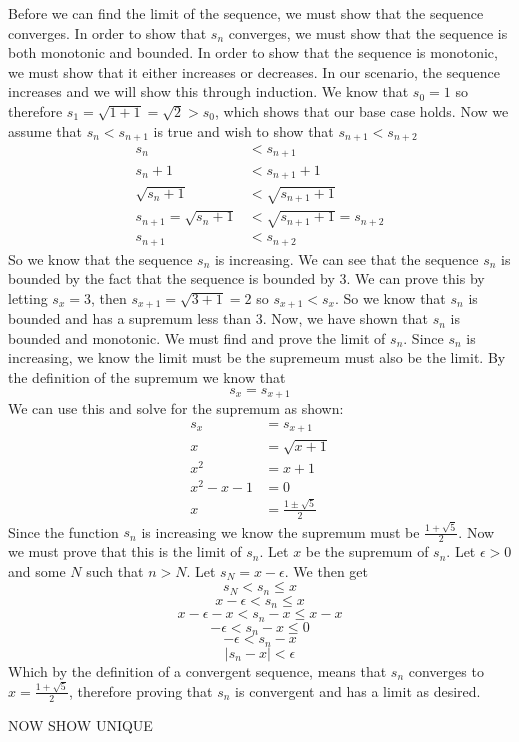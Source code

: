 \begin{solution}
Before we can find the limit of the sequence, we must show that the sequence converges. In order to show that $s_n$ converges, we must show that the sequence is both monotonic and bounded. In order to show that the sequence is monotonic, we must show that it either increases or decreases. In our scenario, the sequence increases and we will show this through induction. We know that $s_0 = 1$ so therefore $s_1 = \sqrt{1 + 1} = \sqrt{2} > s_0$, which shows that our base case holds. Now we assume that $s_n < s_{n+1}$ is true and wish to show that $s_{n+1} < s_{n+2}$
\begin{align*}
    s_n & < s_{n+1} \\
    s_n  + 1& < s_{n+1} + 1\\
    \sqrt{s_n  + 1}& < \sqrt{s_{n+1} + 1}\\
    s_{n+1}= \sqrt{s_n  + 1}& < \sqrt{s_{n+1} + 1} = s_{n+2}\\
    s_{n+1}& < s_{n+2}
\end{align*}
So we know that the sequence $s_n$ is increasing. We can see that the sequence $s_n$ is bounded by the fact that the sequence is bounded by 3. We can prove this by letting $s_x = 3$, then $s_{x+1} = \sqrt{3 + 1} = 2$ so $s_{x+1} < s_x$.
So we know that $s_n$ is bounded and has a supremum less than 3.
Now, we have shown that $s_n$ is bounded and monotonic. We must find and prove the limit of $s_n$. Since $s_n$ is increasing, we know the limit must be the supremeum must also be the limit.
By the definition of the supremum we know that $$s_x = s_{x+1}$$
We can use this and solve for the supremum as shown:
\begin{align*}
    s_x &= s_{x+1} \\
    x &= \sqrt{x + 1} \\
    x^2 &= x + 1 \\
    x^2 - x -1 & = 0\\
    x & = \frac{1 \pm \sqrt{5}}{2}
\end{align*}
Since the function $s_n$ is increasing we know the supremum must be $\frac{1 + \sqrt{5}}{2}$. Now we must prove that this is the limit of $s_n$. Let $x$ be the supremum of $s_n$. Let $\epsilon > 0$ and some $N$ such that $n>N$. Let $s_N = x - \epsilon$. We then get
$$s_N < s_n \leq x $$
$$ x - \epsilon < s_n \leq x $$
$$ x - \epsilon -x  < s_n - x \leq x - x $$
$$ - \epsilon  < s_n - x \leq 0$$
$$ - \epsilon  < s_n - x$$
$$|s_n - x| < \epsilon$$
Which by the definition of a convergent sequence, means that $s_n$ converges to $x = \frac{1 + \sqrt{5}}{2}$, therefore proving that $s_n$ is convergent and has a limit as desired.
\end{solution}

NOW SHOW UNIQUE